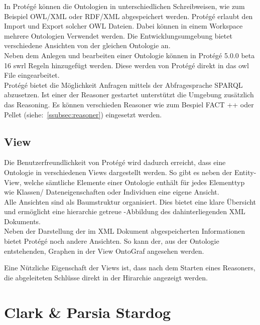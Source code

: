 In Protégé können die Ontologien in unterschiedlichen Schreibweisen, wie zum Beispiel OWL/XML oder RDF/XML abgespeichert werden. Protégé erlaubt den Import und Export solcher OWL Dateien. Dabei können in einem Workspace mehrere Ontologien Verwendet werden. Die Entwicklungsumgebung bietet verschiedene Ansichten von der gleichen Ontologie an. \\
Neben dem Anlegen und bearbeiten einer Ontologie können in Protégé 5.0.0 beta 16 swrl Regeln hinzugefügt werden. Diese werden von Protégé direkt in das owl File eingearbeitet. \\
Protégé bietet die Möglichkeit Anfragen mittels der Abfragesprache SPARQL abzusetzen. Ist einer der Reasoner gestartet unterstützt die Umgebung zusätzlich das Reasoning. Es können verschieden Reasoner wie zum Bespiel FACT ++ oder Pellet (siehe:~\ref{ssubsec:reasoner}) eingesetzt werden.\cite{protegeFeatures} 


\subsection{View}
\label{subsec:komponenten_protege_view}

Die Benutzerfreundlichkeit von Protégé wird dadurch erreicht, dass eine Ontologie in verschiedenen Views dargestellt werden. So gibt es neben der Entity-View, welche sämtliche Elemente einer Ontologie enthält für jedes Elementtyp wie Klassen/ Dateneigenschaften oder Individuen eine eigene Ansicht.\\
Alle Ansichten sind als Baumstruktur organisiert. Dies bietet eine klare Übersicht und ermöglicht eine hierarchie getreue -Abbildung des dahinterliegenden XML Dokuments.\\ 
Neben der Darstellung der im XML Dokument abgespeicherten Informationen bietet Protégé noch andere Ansichten. So kann der, aus der Ontologie entstehenden, Graphen in der View OntoGraf angesehen werden.\cite{protegeView}

Eine Nützliche Eigenschaft der Views ist, dass nach dem Starten eines Reasoners, die abgeleiteten Schlüsse direkt in der Hirarchie angezeigt werden.

\section{Clark \& Parsia Stardog}
\label{sec:komponenten_stardog}

